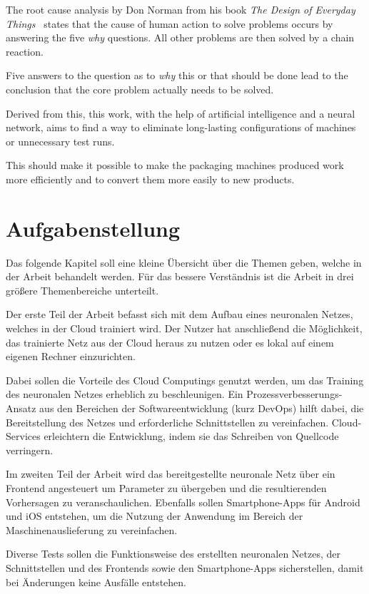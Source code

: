 The root cause analysis by Don Norman from his book \textit{The Design of Everyday
Things}~\cite{book_einleitung_donnorman} states that the cause of human action to solve problems occurs by answering the
five \textit{why} questions. All other problems are then solved by a chain reaction.

Five answers to the question as to \textit{why} this or that should be done lead to the conclusion that the core
problem actually needs to be solved.

Derived from this, this work, with the help of artificial intelligence and a neural network, aims to find a way to
eliminate long-lasting configurations of machines or unnecessary test runs.

This should make it possible to make the packaging machines produced work more efficiently and to convert them more
easily to new products.

\newpage

\section{Aufgabenstellung}
\label{sec:aufgabenstellung}
Das folgende Kapitel soll eine kleine Übersicht über die Themen geben, welche in der Arbeit behandelt werden. Für das
bessere Verständnis ist die Arbeit in drei größere Themenbereiche unterteilt.

Der erste Teil der Arbeit befasst sich mit dem Aufbau eines neuronalen Netzes, welches in der Cloud trainiert wird. Der
Nutzer hat anschließend die Möglichkeit, das trainierte Netz aus der Cloud heraus zu nutzen oder es lokal auf einem
eigenen Rechner einzurichten.

Dabei sollen die Vorteile des Cloud Computings genutzt werden, um das Training des neuronalen Netzes erheblich zu
beschleunigen. Ein Prozessverbesserungs-Ansatz aus den Bereichen der Softwareentwicklung (kurz DevOps) hilft dabei, die
Bereitstellung des Netzes und erforderliche Schnittstellen zu vereinfachen. Cloud-Services erleichtern die Entwicklung,
indem sie das Schreiben von Quellcode verringern.

Im zweiten Teil der Arbeit wird das bereitgestellte neuronale Netz über ein Frontend angesteuert um Parameter  zu
übergeben und die resultierenden Vorhersagen zu veranschaulichen. Ebenfalls sollen Smartphone-Apps für Android und iOS
entstehen, um die Nutzung der Anwendung im Bereich der Maschinenauslieferung zu vereinfachen.

Diverse Tests sollen die Funktionsweise des erstellten neuronalen Netzes, der Schnittstellen und des Frontends
sowie den Smartphone-Apps sicherstellen, damit bei Änderungen keine Ausfälle entstehen.

